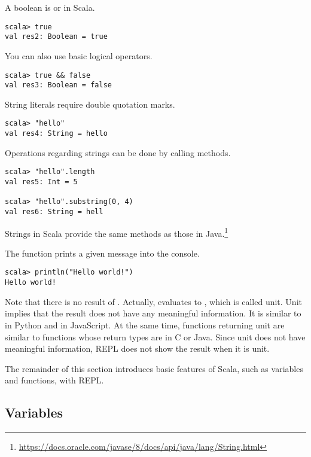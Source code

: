 A boolean is  or  in Scala.

\begin{verbatim}
scala> true
val res2: Boolean = true
\end{verbatim}

You can also use basic logical operators.

\begin{verbatim}
scala> true && false
val res3: Boolean = false
\end{verbatim}

String literals require double quotation marks.

\begin{verbatim}
scala> "hello"
val res4: String = hello
\end{verbatim}

Operations regarding strings can be done by calling methods.

\begin{verbatim}
scala> "hello".length
val res5: Int = 5

scala> "hello".substring(0, 4)
val res6: String = hell
\end{verbatim}

Strings in Scala provide the same methods as those in
Java.\footnote{\url{https://docs.oracle.com/javase/8/docs/api/java/lang/String.html}}

The  function prints a given message into the console.

\begin{verbatim}
scala> println("Hello world!")
Hello world!
\end{verbatim}

Note that there is no result of . Actually,
 evaluates to \code{()}, which is called unit.
Unit implies that the result does not have any meaningful information. It is
similar to  in Python and  in JavaScript. At the
same time, functions returning unit are similar to functions whose return types
are  in C or Java. Since unit does not have meaningful information,
REPL does not show the result when it is unit.

The remainder of this section introduces basic features of Scala, such as
variables and functions, with REPL.

\subsection{Variables}

